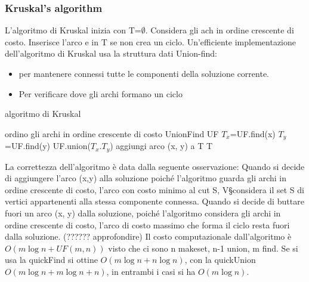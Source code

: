 \documentclass{article}
\begin{document}
\subsubsection{Kruskal's algorithm}
L'algoritmo di Kruskal inizia con T=$\emptyset$. Considera gli ach in ordine crescente di costo. Inserisce l'arco e in T se non crea un ciclo. Un'efficiente implementazione dell'algoritmo di Kruskal usa la  struttura dati Union-find:
\begin{itemize}
    \item per mantenere connessi tutte le componenti della soluzione corrente.
    \item Per verificare dove gli archi formano un ciclo
\end{itemize}
\begin{center}
\begin{algorithm}
\caption{algoritmo di Kruskal}
ordino gli archi in ordine crescente di costo\;
UnionFind UF\;
    {
    $T_x$=UF.find(x)\;
    $T_y$=UF.find(y)\;
     {
        UF.union($T_x.T_y$)\;
        aggiungi  arco (x, y) a T\;
    }
    }
    \Return T\;
\end{algorithm}
\end{center}
La correttezza dell'algoritmo è data dalla seguente osservazione: Quando si decide di aggiungere l'arco (x,y) alla soluzione poiché l'algoritmo guarda gli archi in ordine crescente di costo, l'arco con costo minimo al cut S, V\S considera il set S di vertici appartenenti alla stessa componente connessa. Quando si decide di buttare fuori un arco (x, y) dalla soluzione, poiché l'algoritmo considera gli archi in ordine crescente di costo, l'arco di costo massimo che forma il ciclo resta fuori dalla soluzione. (?????? approfondire)
Il costo computazionale dall'algoritmo è $O(m \log n +UF(m,n))$ visto che ci sono n makeset, n-1 union, m find. Se si usa la quickFind si ottine $O(m \log n +n \log n)$, con la quickUnion $O(m \log n +m \log n +n)$, in entrambi i casi si ha $O(m \log n)$.
\end{document}
